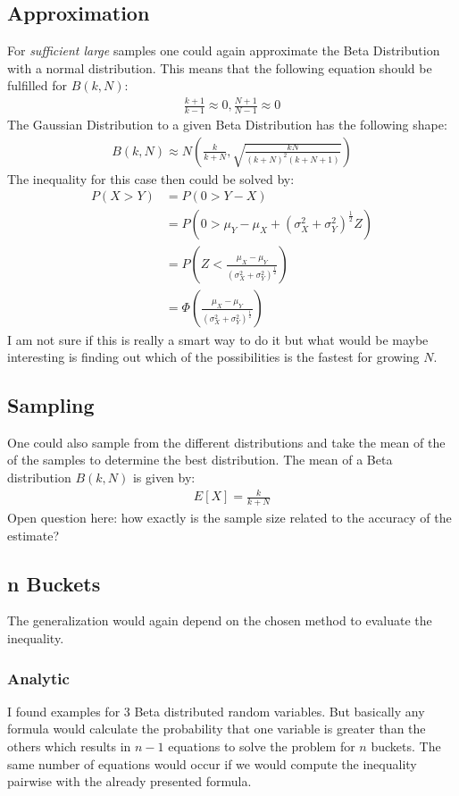 \documentclass[../Thesis.tex]{subfiles}
\begin{document}
\subsection{Approximation}
For \textit{sufficient large} samples one could again approximate the Beta Distribution with a normal distribution. This means that the following equation should be fulfilled for $B(k,N)$:
\begin{align*}
\frac{k + 1}{k - 1}\approx 0,
\frac{N + 1}{N - 1}\approx 0
\end{align*}
The Gaussian Distribution to a given Beta Distribution has the following shape:
\begin{align*}
B(k,N)\approx N\left(\frac{k}{k+N},\sqrt{\frac{kN}{(k+N)^2(k+N+1)}} \right)
\end{align*}
The inequality for this case then could be solved by:
\begin{align*}
P(X>Y)	&= P(0 > Y - X) \\
			&= P(0 > \mu_Y - \mu_X + (\sigma_X^2 + \sigma_Y^2)^{\frac{1}{2}}Z) \\
			&= P\left(Z < \frac{\mu_X - \mu_Y}{(\sigma_X^2 + \sigma_Y^2)^{\frac{1}{2}}}\right) \\
			&= \Phi\left(\frac{\mu_X - \mu_Y}{(\sigma_X^2 + \sigma_Y^2)^{\frac{1}{2}}}\right)
\end{align*}
I am not sure if this is really a smart way to do it but what would be maybe interesting is finding out which of the possibilities is the fastest for growing $N$.

\subsection{Sampling}
One could also sample from the different distributions and take the mean of the of the samples to determine the best distribution. The mean of a Beta distribution $B(k,N)$ is given by:
\begin{align*}
E[X] = \frac{k}{k+N}
\end{align*}
Open question here: how exactly is the sample size related to the accuracy of the estimate?

\subsection{n Buckets}
The generalization would again depend on the chosen method to evaluate the inequality.
\subsubsection{Analytic}
I found examples for 3 Beta distributed random variables. But basically any formula would calculate the probability that one variable is greater than the others which results in $n-1$ equations to solve the problem for $n$ buckets. The same number of equations would occur if we would compute the inequality pairwise with the already presented formula.
\end{document}
